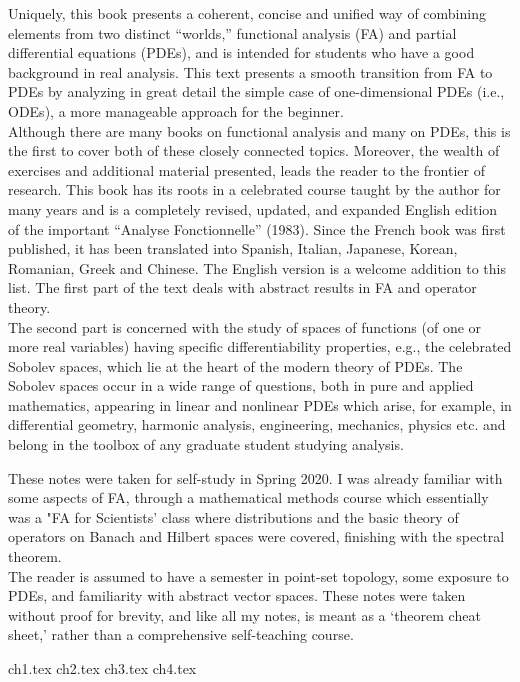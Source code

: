 \documentclass{../booknotes}
\begin{document}
\maketitle
\begin{pubdescrip}

\indent Uniquely, this book presents a coherent, concise and unified way of combining elements from two distinct “worlds,” functional analysis (FA) and partial differential equations (PDEs), and is intended for students who have a good background in real analysis. This text presents a smooth transition from FA to PDEs by analyzing in great detail the simple case of one-dimensional PDEs (i.e., ODEs), a more manageable approach for the beginner. \\
\indent Although there are many books on functional analysis and many on PDEs, this is the first to cover both of these closely connected topics. Moreover, the wealth of exercises and additional material presented, leads the reader to the frontier of research. This book has its roots in a celebrated course taught by the author for many years and is a completely revised, updated, and expanded English edition of the important “Analyse Fonctionnelle” (1983). Since the French book was first published, it has been translated into Spanish, Italian, Japanese, Korean, Romanian, Greek and Chinese. The English version is a welcome addition to this list. The first part of the text deals with abstract results in FA and operator theory. \\
\indent The second part is concerned with the study of spaces of functions (of one or more real variables) having specific differentiability properties, e.g., the celebrated Sobolev spaces, which lie at the heart of the modern theory of PDEs. The Sobolev spaces occur in a wide range of questions, both in pure and applied mathematics, appearing in linear and nonlinear PDEs which arise, for example, in differential geometry, harmonic analysis, engineering, mechanics, physics etc. and belong in the toolbox of any graduate student studying analysis.
\end{pubdescrip}
\begin{transcribernote}
	\indent These notes were taken for self-study in Spring 2020. I was already familiar with some aspects of FA, through a mathematical methods course which essentially was a "FA for Scientists' class where distributions and the basic theory of operators on Banach and Hilbert spaces were covered, finishing with the spectral theorem.\\
	\indent The reader is assumed to have a semester in point-set topology, some exposure to PDEs, and familiarity with abstract vector spaces. These notes were taken without proof for brevity, and like all my notes, is meant as a `theorem cheat sheet,' rather than a comprehensive self-teaching course.
\end{transcribernote}

\tableofcontents


{ch1.tex}
{ch2.tex}
{ch3.tex}
{ch4.tex}
\end{document}
